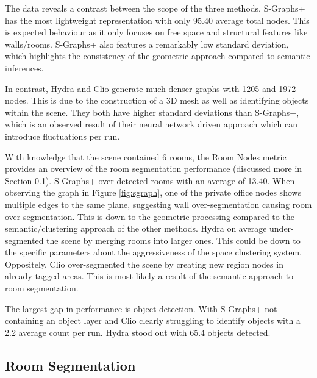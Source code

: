 The data reveals a contrast between the scope of the three methods. S-Graphs+ has the most lightweight representation with only 95.40 average total nodes. This is expected behaviour as it only focuses on free space and structural features like walls/rooms. S-Graphs+ also features a remarkably low standard deviation, which highlights the consistency of the geometric approach compared to semantic inferences.

In contrast, Hydra and Clio generate much denser graphs with 1205 and 1972 nodes. This is due to the construction of a 3D mesh as well as identifying objects within the scene. They both have higher standard deviations than S-Graphs+, which is an observed result of their neural network driven approach which can introduce fluctuations per run.

With knowledge that the scene contained 6 rooms, the Room Nodes metric provides an overview of the room segmentation performance (discussed more in Section \ref{sec:res:room-seg}). S-Graphs+ over-detected rooms with an average of 13.40. When observing the graph in Figure \ref{fig:sgraph}, one of the private office nodes shows multiple edges to the same plane, suggesting wall over-segmentation causing room over-segmentation. This is down to the geometric processing compared to the semantic/clustering approach of the other methods. Hydra on average under-segmented the scene by merging rooms into larger ones. This could be down to the specific parameters about the aggressiveness of the space clustering system. Oppositely, Clio over-segmented the scene by creating new region nodes in already tagged areas. This is most likely a result of the semantic approach to room segmentation.

The largest gap in performance is object detection. With S-Graphs+ not containing an object layer and Clio clearly struggling to identify objects with a 2.2 average count per run. Hydra stood out with 65.4 objects detected.

\subsection{Room Segmentation}\label{sec:res:room-seg}

